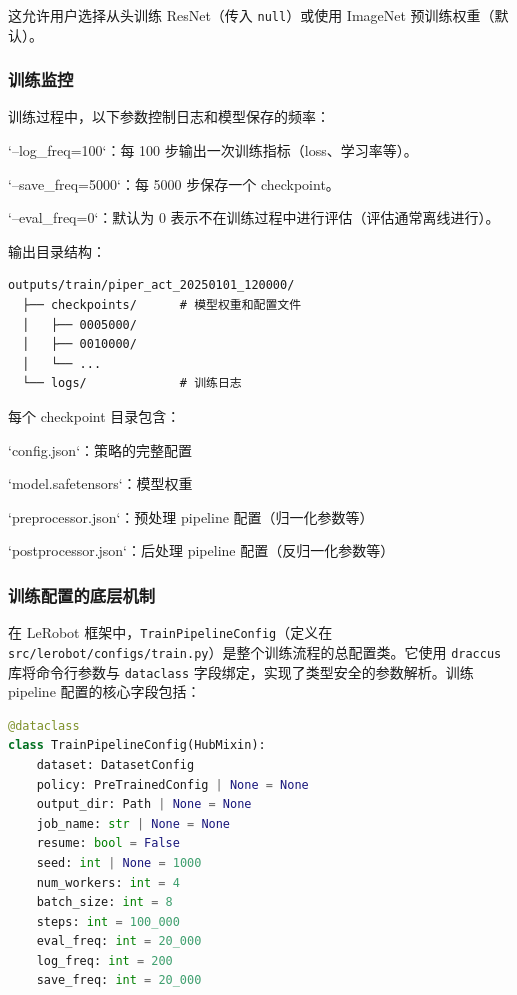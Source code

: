 \documentclass[UTF8,a4paper,11pt]{ctexart}
\begin{document}
{这允许用户选择从头训练 ResNet（传入 \texttt{null}）或使用 ImageNet 预训练权重（默认）。

\subsubsection{训练监控}

训练过程中，以下参数控制日志和模型保存的频率：

\item `--log_freq=100`：每 100 步输出一次训练指标（loss、学习率等）。
\item `--save_freq=5000`：每 5000 步保存一个 checkpoint。
\item `--eval_freq=0`：默认为 0 表示不在训练过程中进行评估（评估通常离线进行）。
\item 输出目录结构：
\begin{lstlisting}[language=text]
  outputs/train/piper_act_20250101_120000/
  ├── checkpoints/      # 模型权重和配置文件
  │   ├── 0005000/
  │   ├── 0010000/
  │   └── ...
  └── logs/             # 训练日志
\end{lstlisting}

每个 checkpoint 目录包含：
\item `config.json`：策略的完整配置
\item `model.safetensors`：模型权重
\item `preprocessor.json`：预处理 pipeline 配置（归一化参数等）
\item `postprocessor.json`：后处理 pipeline 配置（反归一化参数等）

\subsubsection{训练配置的底层机制}

在 LeRobot 框架中，\texttt{TrainPipelineConfig}（定义在 \texttt{src/lerobot/configs/train.py}）是整个训练流程的总配置类。它使用 \texttt{draccus} 库将命令行参数与 \texttt{dataclass} 字段绑定，实现了类型安全的参数解析。训练 pipeline 配置的核心字段包括：

\begin{lstlisting}[language=python]
@dataclass
class TrainPipelineConfig(HubMixin):
    dataset: DatasetConfig
    policy: PreTrainedConfig | None = None
    output_dir: Path | None = None
    job_name: str | None = None
    resume: bool = False
    seed: int | None = 1000
    num_workers: int = 4
    batch_size: int = 8
    steps: int = 100_000
    eval_freq: int = 20_000
    log_freq: int = 200
    save_freq: int = 20_000
\end{lstlisting}

}
\end{document}
